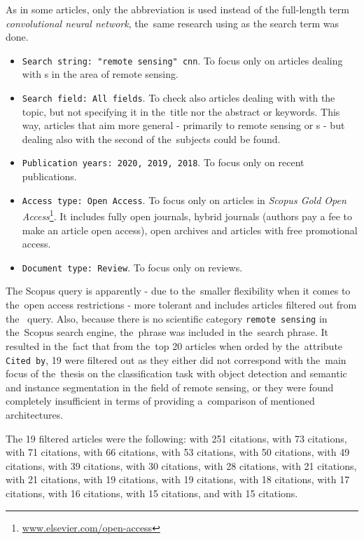 As in some articles, only the abbreviation \textit{} is used instead of the full-length term \textit{convolutional neural network}, the~same research using \textit{} as the search term was done.

\begin{itemize}
	\item \verb|Search string: "remote sensing" cnn|. To focus only on articles dealing with s in the area of remote sensing.
	\item \verb|Search field: All fields|. To check also articles dealing with with the topic, but not specifying it in the~title nor the abstract or keywords. This way, articles that aim more general - primarily to remote sensing or s - but dealing also with the second of the~subjects could be found.
	\item \verb|Publication years: 2020, 2019, 2018|. To focus only on recent publications.
	\item \verb|Access type: Open Access|. To focus only on articles in \textit{Scopus Gold Open Access}\footnote{\url{www.elsevier.com/open-access}}. It includes fully open journals, hybrid journals (authors pay a fee to make an article open access), open archives and articles with free promotional access.
	\item \verb|Document type: Review|. To focus only on reviews.
\end{itemize}

The Scopus query is apparently - due to the~smaller flexibility when it comes to the~open access restrictions - more tolerant and includes articles filtered out from the~ query. Also, because there is no scientific category \verb|remote sensing| in the~Scopus search engine, the~phrase was included in the~search phrase. It resulted in the~fact that from the~top 20 articles when orded by the~attribute \verb|Cited by|, 19 were filtered out as they either did not correspond with the~main focus of the~thesis on the classification task with object detection and semantic and instance segmentation in the field of remote sensing, or they were found completely insufficient in terms of providing a~comparison of mentioned architectures.

The 19 filtered articles were the following: \cite{dl-for-cv} with 251 citations, \cite{state-of-the-art-dl} with 73 citations, \cite{review-water-dl} with 71 citations, \cite{review-plant-stress} with 66 citations, \cite{review-text-class} with 53 citations, \cite{review-oil-spill} with 50 citations, \cite{review-cv-infra-inspections} with 49 citations, \cite{review-vessel-detection} with 39 citations, \cite{review-ml-smart-grid} with 30 citations, \cite{review-autonomus-vehicles} with 28 citations, \cite{review-grasp} with 21 citations, \cite{review-3d-human-interaction} with 21 citations, \cite{review-dl-3d-classification} with 19 citations, \cite{review-crop-phenomics} with 19 citations, \cite{review-age-estimation} with 18 citations, \cite{review-shot-boundary} with 17 citations, \cite{review-crop-phenomics-breeding} with 16 citations, \cite{review-video-crowd} with 15 citations, and \cite{review-dl-food} with 15 citations.

